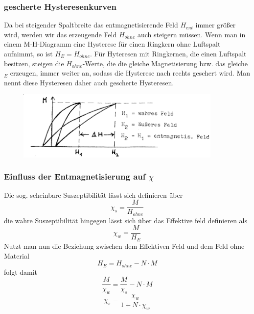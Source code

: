         \subsubsection*{gescherte Hysteresenkurven}
            Da bei steigender Spaltbreite das entmagnetisierende Feld $H_{ent}$ immer größer wird, werden wir das erzeugende Feld $H_{ohne}$ 
            auch steigern müssen. Wenn man in einem M-H-Diagramm eine Hysterese für einen Ringkern
            ohne Luftspalt aufnimmt, so ist $H_{E}=H_{ohne}$. Für Hyteresen mit Ringkernen,
            die einen Luftspalt besitzen, steigen die $H_{ohne}$-Werte, die die gleiche Magnetisierung
            bzw. das gleiche $_{E}$ erzeugen, immer weiter an, sodass die Hysterese nach rechts
            geschert wird. Man nennt diese Hysteresen daher auch gescherte Hysteresen.
            \begin{figure}
                \centering
                \includegraphics[width=0.9\textwidth]{Images/geschert.png}
            \end{figure}
            
        \subsubsection*{Einfluss der Entmagnetisierung auf $\chi$}
            Die sog. scheinbare Suszeptibilität lässt sich definieren über
            \begin{equation}
                \chi_s = \frac{M}{H_{ohne}}
            \end{equation}
            die wahre Suszeptibilität hingegen lässt sich über das Effektive feld definieren als
            \begin{equation}
                \chi_w = \frac{M}{H_{E}}
            \end{equation}
            Nutzt man nun die Beziehung zwischen dem Effektiven Feld und dem Feld ohne Material
            \begin{equation}
                H_E = H_{ohne} - N\cdot M
            \end{equation}
            folgt damit
            \begin{equation}
                \frac{M}{\chi_w} = \frac{M}{\chi_s} - N \cdot M
            \end{equation}
            \begin{equation}
                \chi_s = \frac{\chi_w}{1+N\cdot \chi_w}
            \end{equation}

            
